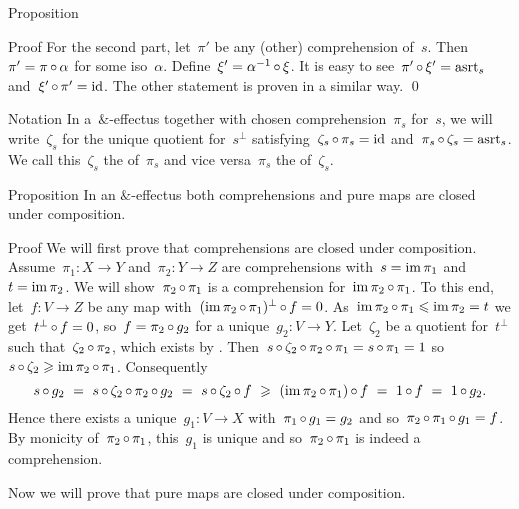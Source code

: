 \documentclass[b]{subfiles}
\begin{document}
\begin{parsec}
\begin{point}{Proposition}
\begin{point}{Proof}
For the second part,
let~$\pi'$ be any (other) comprehension of~$s$.
Then~$\pi' = \pi \mathop{\circ} \alpha$ for some iso~$\alpha$.
Define~$\xi' = \alpha^{-1} \mathop{\circ} \xi$.
It is easy to see~$\pi' \mathop{\circ} \xi' = \mathrm{asrt}_s$
and~$\xi' \mathop{\circ} \pi' = \operatorname{id}$.
The other statement is proven in a similar way. \qed
\end{point}
\begin{point}{Notation}%
In a~$\&$-effectus
    together with chosen comprehension~$\pi_s$ for~$s$,
    we will write~$\zeta_s$
    for the unique quotient for~$s^\perp$
    satisfying~$\zeta_s \mathop{\circ} \pi_s = \operatorname{id}$
    and~$\pi_s \mathop{\circ} \zeta_s = \mathrm{asrt}_s$.
We call this~$\zeta_s$
    the  of~$\pi_s$
    and vice versa~$\pi_s$ the 
    of~$\zeta_s$.
\end{point}
\end{point}
\begin{point}{Proposition}%
In an $\&$-effectus
    both comprehensions and pure maps are closed under composition.
\begin{point}{Proof}%
We will first prove that comprehensions are closed under composition.
Assume~$\pi_1 \colon X \to Y$
    and~$\pi_2 \colon Y \to Z$
    are comprehensions with~$s = \operatorname{im} \pi_1$
    and~$t = \operatorname{im} \pi_2$.
We will show~$\pi_2 \mathop{\circ} \pi_1$
    is a comprehension for~$\operatorname{im} \pi_2 \mathop{\circ} \pi_1$.
To this end, let~$f\colon V\to Z$ be any map
with~$(\operatorname{im} \pi_2 \mathop{\circ} \pi_1)^\perp \mathop{\circ} f = 0$.
As~$\operatorname{im} \pi_2 \mathop{\circ} \pi_1 \leqslant \operatorname{im} \pi_2 = t$
    we get~$t^\perp \mathop{\circ} f = 0$,
    so~$f = \pi_2 \mathop{\circ} g_2$ for a unique~$g_2\colon V \to Y$.
Let~$\zeta_2$ be a quotient for~$t^\perp$
such that~$\zeta_2 \mathop{\circ} \pi_2$,
which exists by .
Then~$s \mathop{\circ} \zeta_2 \mathop{\circ} \pi_2 \mathop{\circ} \pi_1
            = s \mathop{\circ} \pi_1 = 1$
            so~$s \mathop{\circ} \zeta_2 \geqslant \operatorname{im} \pi_2 \mathop{\circ} \pi_1$.
Consequently
\begin{equation*}
    s \mathop{\circ} g_2 \ =\  s \mathop{\circ} \zeta_2 \mathop{\circ} \pi_2 \mathop{\circ} g_2
        \ =\  s \mathop{\circ} \zeta_2 \mathop{\circ} f
        \ \geqslant\   (\operatorname{im} \pi_2 \mathop{\circ} \pi_1) \mathop{\circ} f \ =\  1 \mathop{\circ} f
                \ =\  1 \mathop{\circ} g_2.
\end{equation*}
Hence there exists a unique~$g_1\colon V \to X$
    with~$\pi_1 \mathop{\circ} g_1 = g_2$
    and so~$\pi_2 \mathop{\circ} \pi_1 \mathop{\circ} g_1 = f$.
By monicity of~$\pi_2 \mathop{\circ} \pi_1$,
    this~$g_1$ is unique and so~$\pi_2 \mathop{\circ} \pi_1$
    is indeed a comprehension.
\begin{point}%
Now we will prove that pure maps are closed under composition.

\end{point}
\end{point}
\end{point}
\end{parsec}
\end{document}
